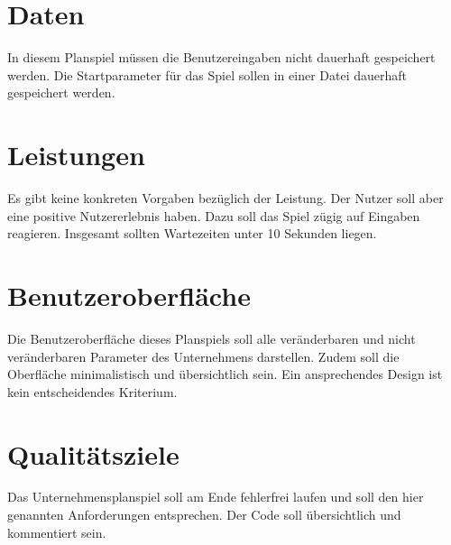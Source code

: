 \section{Daten}
In diesem Planspiel müssen die Benutzereingaben nicht dauerhaft gespeichert werden. Die Startparameter für das Spiel sollen in einer Datei dauerhaft gespeichert werden.

\section{Leistungen}
Es gibt keine konkreten Vorgaben bezüglich der Leistung. Der Nutzer soll aber eine positive Nutzererlebnis haben. Dazu soll das Spiel zügig auf Eingaben reagieren. Insgesamt sollten Wartezeiten unter 10 Sekunden liegen.

\section{Benutzeroberfläche}
Die Benutzeroberfläche dieses Planspiels soll alle veränderbaren und nicht veränderbaren Parameter des Unternehmens darstellen. Zudem soll die Oberfläche minimalistisch und übersichtlich sein. Ein ansprechendes Design ist kein entscheidendes Kriterium.

\section{Qualitätsziele}
Das Unternehmensplanspiel soll am Ende fehlerfrei laufen und soll den hier genannten Anforderungen entsprechen. Der Code soll übersichtlich und kommentiert sein.


